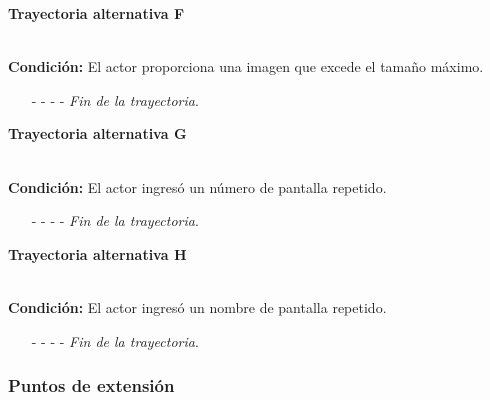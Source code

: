 \hypertarget{CU11-1:TAF}{\textbf{Trayectoria alternativa F}}\\
\noindent \textbf{Condición:} El actor proporciona una imagen que excede el tamaño máximo.
\begin{enumerate}
	\UCpaso[\UCsist] Muestra el mensaje  señalando el campo que presenta el error en la pantalla .
	\UCpaso Regresa al paso \ref{CU11.1-P4} de la trayectoria principal.
	\item[- -] - - {\em {Fin de la trayectoria}}.
\end{enumerate}

\hypertarget{CU11-1:TAG}{\textbf{Trayectoria alternativa G}}\\
\noindent \textbf{Condición:} El actor ingresó un número de pantalla repetido.
\begin{enumerate}
	\UCpaso[\UCsist] Muestra el mensaje  señalando el campo que presenta la duplicidad en la pantalla .
	\UCpaso Regresa al paso \ref{CU11.1-P3} de la trayectoria principal.
	\item[- -] - - {\em {Fin de la trayectoria}}.
\end{enumerate}
\hypertarget{CU11-1:TAH}{\textbf{Trayectoria alternativa H}}\\
\noindent \textbf{Condición:} El actor ingresó un nombre de pantalla repetido.
\begin{enumerate}
	\UCpaso[\UCsist] Muestra el mensaje  señalando el campo que presenta la duplicidad en la pantalla .
	\UCpaso Regresa al paso \ref{CU11.1-P3} de la trayectoria principal.
	\item[- -] - - {\em {Fin de la trayectoria}}.
\end{enumerate}

\subsubsection{Puntos de extensión}

